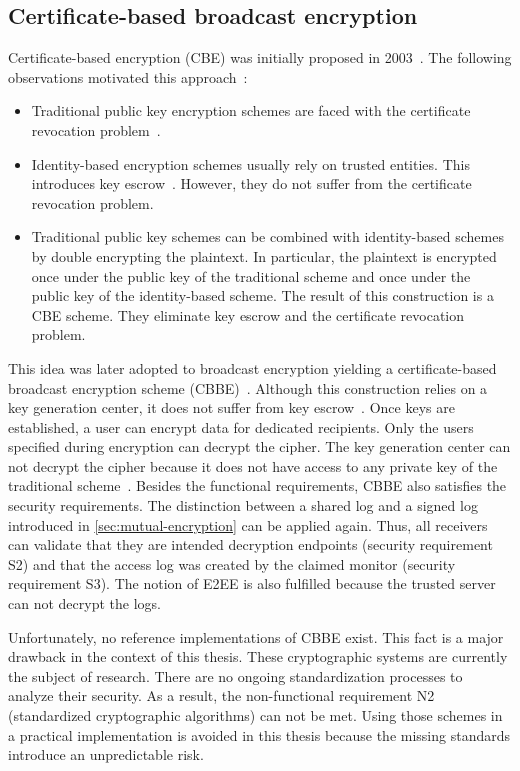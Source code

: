 \documentclass[../main.tex]{subfiles}
\begin{document}
\subsection{Certificate-based broadcast encryption}
\label{sec:broadcast-certificate}

Certificate-based encryption (CBE) was initially proposed in 2003~\cite{Gentry2003}. 
The following observations motivated this approach~\cite{Hagg2022}:
\begin{itemize}
    \item 
    Traditional public key encryption schemes are faced with the certificate revocation problem~\cite{Gentry2003}.
    \item 
    Identity-based encryption schemes usually rely on trusted entities. 
    This introduces key escrow~\cite{Hagg2022}.
    However, they do not suffer from the certificate revocation problem.
    \item 
    Traditional public key schemes can be combined with identity-based schemes by double encrypting the plaintext.
    In particular, the plaintext is encrypted once under the public key of the traditional scheme and once under the public key of the identity-based scheme.
    The result of this construction is a CBE scheme.
    They eliminate key escrow and the certificate revocation problem.
\end{itemize}

This idea was later adopted to broadcast encryption yielding a certificate-based broadcast encryption scheme (CBBE)~\cite{Li2018}.
Although this construction relies on a key generation center, it does not suffer from key escrow~\cite{Hagg2022}.
Once keys are established, a user can encrypt data for dedicated recipients.
Only the users specified during encryption can decrypt the cipher.
The key generation center can not decrypt the cipher because it does not have access to any private key of the traditional scheme~\cite{Hagg2022}.
Besides the functional requirements, CBBE also satisfies the security requirements.
The distinction between a shared log and a signed log introduced in \cref{sec:mutual-encryption} can be applied again.
Thus, all receivers can validate that they are intended decryption endpoints (security requirement S2) and that the access log was created by the claimed monitor (security requirement S3).
The notion of E2EE is also fulfilled because the trusted server can not decrypt the logs.

Unfortunately, no reference implementations of CBBE exist.
This fact is a major drawback in the context of this thesis.
These cryptographic systems are currently the subject of research.
There are no ongoing standardization processes to analyze their security.
As a result, the non-functional requirement N2 (standardized cryptographic algorithms) can not be met.
Using those schemes in a practical implementation is avoided in this thesis because the missing standards introduce an unpredictable risk.
\end{document}
